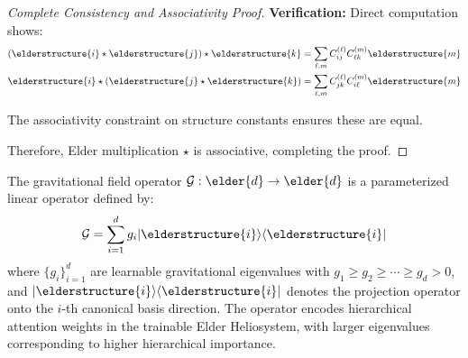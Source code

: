 \begin{proof}[Complete Consistency and Associativity Proof]
\textbf{Verification:} Direct computation shows:
\begin{align}
(\elderstructure{i} \star \elderstructure{j}) \star \elderstructure{k} &= \sum_{\ell,m} C_{ij}^{(\ell)} C_{\ell k}^{(m)} \elderstructure{m}\\
\elderstructure{i} \star (\elderstructure{j} \star \elderstructure{k}) &= \sum_{\ell,m} C_{jk}^{(\ell)} C_{i\ell}^{(m)} \elderstructure{m}
\end{align}

The associativity constraint on structure constants ensures these are equal.

Therefore, Elder multiplication $\star$ is associative, completing the proof.
\end{proof}

\begin{definition}
\label{def:gravitational_field_operator}
The gravitational field operator $\mathcal{G}: \elder{d} \rightarrow \elder{d}$ is a parameterized linear operator defined by:
\begin{equation}
\mathcal{G} = \sum_{i=1}^{d} g_i |\elderstructure{i}\rangle\langle\elderstructure{i}|
\end{equation}
where $\{g_i\}_{i=1}^{d}$ are learnable gravitational eigenvalues with $g_1 \geq g_2 \geq \cdots \geq g_d > 0$, and $|\elderstructure{i}\rangle\langle\elderstructure{i}|$ denotes the projection operator onto the $i$-th canonical basis direction. The operator encodes hierarchical attention weights in the trainable Elder Heliosystem, with larger eigenvalues corresponding to higher hierarchical importance.
\end{definition}

